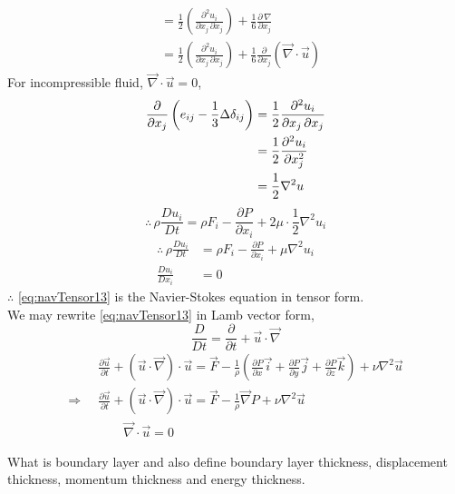 \documentclass[../main-sheet.tex]{subfiles}
\begin{document}
\begin{soln}
\begin{align*}
        &=\frac{1}{2}\left( \frac{\partial^2 u_i}{\partial x_j\,\partial x_j} \right)+\frac{1}{6}\frac{\partial\,\nabla}{\partial x_j}\\
        &=\frac{1}{2}\left( \frac{\partial^2 u_i}{\partial x_j\,\partial x_j} \right)+\frac{1}{6}\frac{\partial}{\partial x_j}(\vec{\nabla}\cdot\vec{u})
    \end{align*}
    For incompressible fluid, \(\vec{\nabla}\cdot\vec{u}=0\),
    \begin{align*}
        \frac{\partial }{\partial x_j}\left( e_{ij}-\frac{1}{3}\Delta \delta_{ij} \right)&=\frac{1}{2}\frac{\partial^2 u_i}{\partial x_j\,\partial x_j}\\
        &=\frac{1}{2} \frac{\partial^2 u_i}{\partial x_j^2}\\
        &=\frac{1}{2}\nabla^2u
    \end{align*}
    \[\therefore \, \rho \frac{D u_i}{D t}=\rho F_i-\frac{\partial P}{\partial x_i}+2\mu\cdot \frac{1}{2}\nabla^2u_i\]
    \begin{equation}
        \begin{aligned}
            \therefore \, \rho \frac{D u_i}{D t}&=\rho F_i-\frac{\partial P}{\partial x_i}+\mu\nabla^2u_i\\
            \frac{D u_i}{D x_i}&=0
        \end{aligned}
        \label{eq:navTensor13}
    \end{equation}
    \(\therefore\) \eqref{eq:navTensor13} is the Navier-Stokes equation in tensor form.\\
    We may rewrite \eqref{eq:navTensor13} in Lamb vector form,
    \[\frac{D}{D t}=\frac{\partial }{\partial t}+\vec{u}\cdot \vec{\nabla}\]
    \begin{align*}
        &\frac{\partial \vec{u}}{\partial t}+(\vec{u}\cdot \vec{\nabla})\cdot\vec{u}=\vec{F}-\frac{1}{\rho}\left( \frac{\partial P}{\partial x}\vec{i}+\frac{\partial P}{\partial y}\vec{j}+\frac{\partial P}{\partial z}\vec{k} \right)+\nu\nabla^2 \vec{u}\\
        \Rightarrow\;\;&\frac{\partial \vec{u}}{\partial t}+(\vec{u}\cdot \vec{\nabla})\cdot\vec{u}=\vec{F}-\frac{1}{\rho}\vec{\nabla}P+\nu\nabla^2 \vec{u}\\
        &\qquad\vec{\nabla}\cdot\vec{u}=0
    \end{align*}
\end{soln}
\begin{prob}
    What is boundary layer and also define boundary layer thickness, displacement thickness, momentum thickness and energy thickness.
\end{prob}
\end{document}
